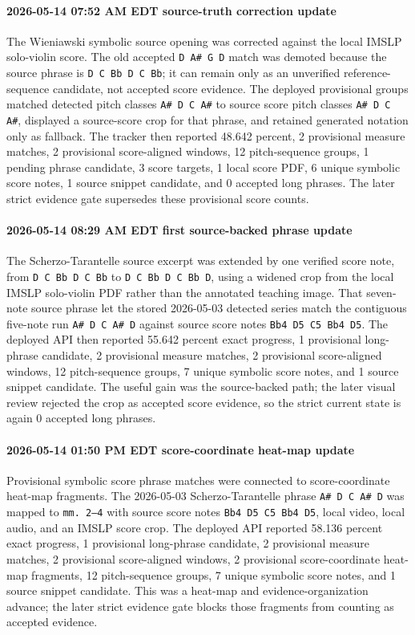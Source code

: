 \paragraph{2026-05-14 07:52 AM EDT source-truth correction update} The Wieniawski symbolic source opening was corrected against the local IMSLP solo-violin score. The old accepted \texttt{D A\# G D} match was demoted because the source phrase is \texttt{D C Bb D C Bb}; it can remain only as an unverified reference-sequence candidate, not accepted score evidence. The deployed provisional groups matched detected pitch classes \texttt{A\# D C A\#} to source score pitch classes \texttt{A\# D C A\#}, displayed a source-score crop for that phrase, and retained generated notation only as fallback. The tracker then reported 48.642 percent, 2 provisional measure matches, 2 provisional score-aligned windows, 12 pitch-sequence groups, 1 pending phrase candidate, 3 score targets, 1 local score PDF, 6 unique symbolic score notes, 1 source snippet candidate, and 0 accepted long phrases. The later strict evidence gate supersedes these provisional score counts.

\paragraph{2026-05-14 08:29 AM EDT first source-backed phrase update} The Scherzo-Tarantelle source excerpt was extended by one verified score note, from \texttt{D C Bb D C Bb} to \texttt{D C Bb D C Bb D}, using a widened crop from the local IMSLP solo-violin PDF rather than the annotated teaching image. That seven-note source phrase let the stored 2026-05-03 detected series match the contiguous five-note run \texttt{A\# D C A\# D} against source score notes \texttt{Bb4 D5 C5 Bb4 D5}. The deployed API then reported 55.642 percent exact progress, 1 provisional long-phrase candidate, 2 provisional measure matches, 2 provisional score-aligned windows, 12 pitch-sequence groups, 7 unique symbolic score notes, and 1 source snippet candidate. The useful gain was the source-backed path; the later visual review rejected the crop as accepted score evidence, so the strict current state is again 0 accepted long phrases.

\paragraph{2026-05-14 01:50 PM EDT score-coordinate heat-map update} Provisional symbolic score phrase matches were connected to score-coordinate heat-map fragments. The 2026-05-03 Scherzo-Tarantelle phrase \texttt{A\# D C A\# D} was mapped to \texttt{mm. 2--4} with source score notes \texttt{Bb4 D5 C5 Bb4 D5}, local video, local audio, and an IMSLP score crop. The deployed API reported 58.136 percent exact progress, 1 provisional long-phrase candidate, 2 provisional measure matches, 2 provisional score-aligned windows, 2 provisional score-coordinate heat-map fragments, 12 pitch-sequence groups, 7 unique symbolic score notes, and 1 source snippet candidate. This was a heat-map and evidence-organization advance; the later strict evidence gate blocks those fragments from counting as accepted evidence.

